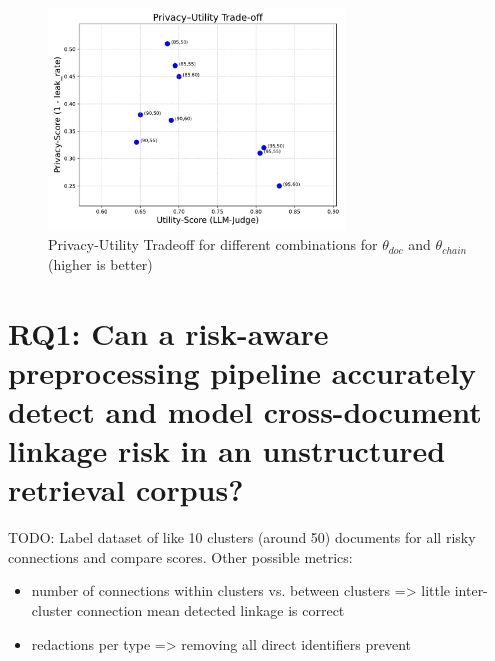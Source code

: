 \begin{figure}[h]
    \centering
    \includegraphics[width=0.7\textwidth]{figures/c3_privacy_utility_tradeoff.pdf}
    \caption{Privacy-Utility Tradeoff for different combinations for  $\theta_{doc}$ and $\theta_{chain}$ (higher is better)}
    \label{approach-fig:privacy_utility_thetas}
\end{figure} 

\section{RQ1: Can a risk-aware preprocessing pipeline accurately detect and model cross-document linkage risk in an unstructured retrieval corpus?}
TODO: Label dataset of like 10 clusters (around 50) documents for all risky connections and compare scores.
Other possible metrics: 
\begin{itemize}
    \item number of connections within clusters vs. between clusters => little inter-cluster connection mean detected linkage is correct
    \item redactions per type => removing all direct identifiers prevent
\end{itemize}
